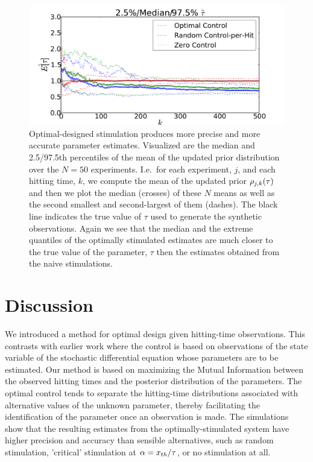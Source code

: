\documentclass{article}
\begin{document}
\begin{figure}[htp]
\begin{center}
  \includegraphics[width=\textwidth]{Figs/HTOnlineEstimator/online_updated_prior_quantiles_mean_per_experiment.pdf}
  \caption[Quantiles of the Mean Estimates]{Optimal-designed stimulation produces more precise and more accurate
  parameter estimates. 
  Visualized are the median and
  2.5/97.5th percentiles of the mean of the updated prior
  distribution over the $N=50$ experiments. I.e.\ for each experiment, $j$, and
  each hitting time, $k$, we compute the mean of the updated prior $\rho_{j,k}({ \tau })$
  and then we plot the median (crosses) of these $N$ means as well as the second
  smallest and second-largest of them (dashes). 
  The black line indicates the true value of $\tau$ used to generate the
  synthetic observations. 
  Again we see that the median and the extreme quantiles of the
  optimally stimulated estimates are much closer to the true value of the parameter, $\tau$ then the estimates obtained from the naive stimulations.}
  \label{fig:online_optimization_quantiles_belief_evolution}
\end{center}
\end{figure}

\section{Discussion}
\label{sec:discussion}
We introduced a method for optimal design given hitting-time observations. This
contrasts with earlier work where the control is based on observations of the
state variable of the stochastic differential equation whose parameters are to
be estimated. Our method is based on maximizing the Mutual Information between
the observed hitting times and the posterior distribution of the parameters. The
optimal control tends to separate the hitting-time distributions associated with
alternative values of the unknown parameter, thereby facilitating the
identification of the parameter once an observation is made. The simulations
show that the resulting estimates from the optimally-stimulated system have
higher precision and accuracy than sensible alternatives, such as random
stimulation, 'critical' stimulation at $\alpha={ x_{th} }/{ \tau }$, or no stimulation at
all.
\end{document}
